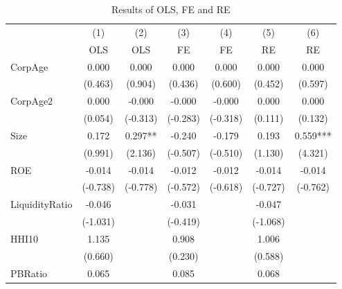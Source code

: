 \begin{table}[htbp]\centering
\def\sym#1{\ifmmode^{#1}\else\(^{#1}\)\fi}
\caption{Results of OLS, FE and RE \label{tab:esttab}}
\begin{tabular}{l*{6}{c}}
\hline\hline
            &\multicolumn{1}{c}{(1)}&\multicolumn{1}{c}{(2)}&\multicolumn{1}{c}{(3)}&\multicolumn{1}{c}{(4)}&\multicolumn{1}{c}{(5)}&\multicolumn{1}{c}{(6)}\\
            &\multicolumn{1}{c}{OLS}&\multicolumn{1}{c}{OLS}&\multicolumn{1}{c}{FE}&\multicolumn{1}{c}{FE}&\multicolumn{1}{c}{RE}&\multicolumn{1}{c}{RE}\\
\hline
CorpAge     &       0.000   &       0.000   &       0.000   &       0.000   &       0.000   &       0.000   \\
            &     (0.463)   &     (0.904)   &     (0.436)   &     (0.600)   &     (0.452)   &     (0.597)   \\
[1em]
CorpAge2    &       0.000   &      -0.000   &      -0.000   &      -0.000   &       0.000   &       0.000   \\
            &     (0.054)   &    (-0.313)   &    (-0.283)   &    (-0.318)   &     (0.111)   &     (0.132)   \\
[1em]
Size        &       0.172   &       0.297** &      -0.240   &      -0.179   &       0.193   &       0.559***\\
            &     (0.991)   &     (2.136)   &    (-0.507)   &    (-0.510)   &     (1.130)   &     (4.321)   \\
[1em]
ROE         &      -0.014   &      -0.014   &      -0.012   &      -0.012   &      -0.014   &      -0.014   \\
            &    (-0.738)   &    (-0.778)   &    (-0.572)   &    (-0.618)   &    (-0.727)   &    (-0.762)   \\
[1em]
LiquidityRatio&      -0.046   &               &      -0.031   &               &      -0.047   &               \\
            &    (-1.031)   &               &    (-0.419)   &               &    (-1.068)   &               \\
[1em]
HHI10       &       1.135   &               &       0.908   &               &       1.006   &               \\
            &     (0.660)   &               &     (0.230)   &               &     (0.588)   &               \\
[1em]
PBRatio     &       0.065   &               &       0.085   &               &       0.068   &               \\

\end{tabular}
\end{table}

